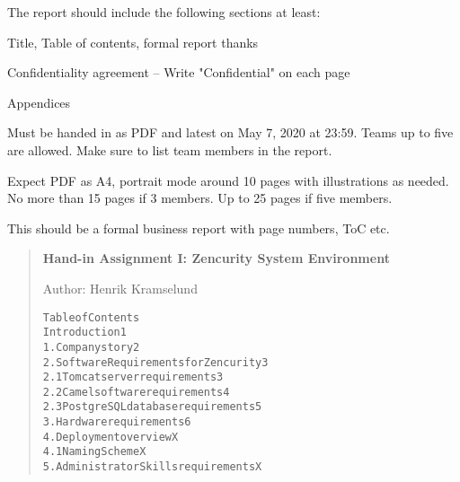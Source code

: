 \documentclass[Screen16to9,17pt]{foils}
\begin{document}

The report should include the following sections at least:
\begin{list2}
\item Title, Table of contents, formal report thanks
\item Confidentiality agreement -- Write "Confidential" on each page
\item Appendices
\end{list2}

Must be handed in as PDF and latest on May 7, 2020 at 23:59. Teams up to five are allowed. Make sure to list team members in the report.

Expect PDF as A4, portrait mode around 10 pages with illustrations as needed.
No more than 15 pages if 3 members. Up to 25 pages if five members.

This should be a formal business report with page numbers, ToC etc.


\begin{quote}{\bf\large
Hand-in Assignment I:
Zencurity System Environment}

Author: Henrik Kramselund  
\begin{alltt}
  Table of Contents
  Introduction                               1
  1. Company story                           2
  2. Software Requirements for Zencurity     3
  2.1 Tomcat server requirements             3
  2.2 Camel software requirements            4
  2.3 PostgreSQL database requirements       5
  3. Hardware requirements                   6
  4. Deployment overview                     X
  4.1 Naming Scheme                          X
  5. Administrator Skills requirements       X
\end{alltt}
\end{quote}








\slidenext
\end{document}
